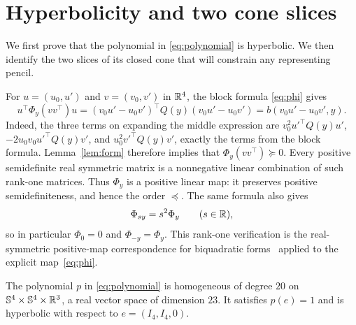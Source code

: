 \section{Hyperbolicity and two cone slices}
\label{sec:hyperbolic}

We first prove that the polynomial in \eqref{eq:polynomial} is
hyperbolic.  We then identify the two slices of its closed cone that
will constrain any representing pencil.

For $u=(u_0,u')$ and $v=(v_0,v')$ in $\mathbb R^4$, the block formula
\eqref{eq:phi} gives
\begin{equation}
 u^\top\Phi_y(vv^\top)u
 = (v_0u'-u_0v')^\top Q(y)(v_0u'-u_0v')
 = b(v_0u'-u_0v',y).
 \label{eq:rank-one}
\end{equation}
Indeed, the three terms on expanding the middle expression are
$v_0^2u'^\top Q(y)u'$, $-2u_0v_0u'^\top Q(y)v'$, and
$u_0^2v'^\top Q(y)v'$, exactly the terms from the block formula.
Lemma~\ref{lem:form} therefore implies that
$\Phi_y(vv^\top)\succeq0$.  Every positive semidefinite real symmetric
matrix is a nonnegative linear combination of such rank-one matrices.
Thus $\Phi_y$ is a positive linear map: it preserves positive
semidefiniteness, and hence the order $\preceq$.
The same formula also gives
\begin{equation}
 \Phi_{s y}=s^2\Phi_y\qquad(s\in\mathbb R),
 \label{eq:phi-scaling}
\end{equation}
so in particular $\Phi_0=0$ and $\Phi_{-y}=\Phi_y$.
This rank-one verification is the real-symmetric positive-map
correspondence for biquadratic forms~\cite[Section~3]{ha-2013}
applied to the explicit map~\eqref{eq:phi}.

\begin{proposition}\label{prop:hyperbolic}
The polynomial $p$ in \eqref{eq:polynomial} is homogeneous of
degree $20$ on $\mathbb S^4\times\mathbb S^4\times\mathbb R^3$, a real vector
space of dimension $23$.  It satisfies $p(e)=1$ and is hyperbolic
with respect to $e=(I_4,I_4,0)$.
\end{proposition}

